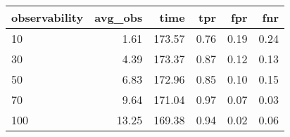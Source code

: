 \begin{tabular}{lrrrrr}
\toprule
observability &  avg\_obs &   time &  tpr &  fpr &  fnr \\
\midrule
           10 &     1.61 & 173.57 & 0.76 & 0.19 & 0.24 \\
           30 &     4.39 & 173.37 & 0.87 & 0.12 & 0.13 \\
           50 &     6.83 & 172.96 & 0.85 & 0.10 & 0.15 \\
           70 &     9.64 & 171.04 & 0.97 & 0.07 & 0.03 \\
          100 &    13.25 & 169.38 & 0.94 & 0.02 & 0.06 \\
\bottomrule
\end{tabular}
